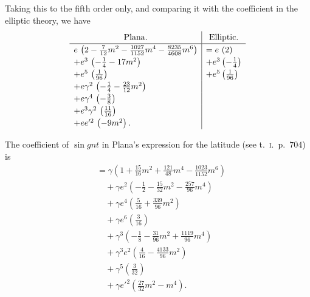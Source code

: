 \documentclass[11pt]{article}
\begin{document}
\medskip

Taking this to the fifth order only, and comparing it with the
coefficient in the elliptic theory, we have
\[
\renewcommand{\arraystretch}{1.2}
\begin{array}{l|l}
\multicolumn{1}{c|}{\text{Plana.}} & \multicolumn{1}{c}{\text{Elliptic.}} \\
\hline
e\,\left(2 - \tfrac{7}{12}m^{2} - \tfrac{1027}{1152}m^{4} - \tfrac{8235}{4608}m^{6}\right)
   & = e\,\left(2\right) \\
+ e^{3}\,\left(-\tfrac{1}{4} - 17m^{2}\right) & + e^{3}\left(-\tfrac{1}{4}\right) \\
+ e^{5}\,\left(\tfrac{1}{96}\right) & + e^{5}\left(\tfrac{1}{96}\right) \\
+ e\gamma^{2}\,\left(-\tfrac{1}{4} - \tfrac{23}{12}m^{2}\right) \\
+ e\gamma^{4}\,\left(-\tfrac{3}{8}\right) \\
+ e^{3}\gamma^{2}\,\left(\tfrac{11}{16}\right) \\
+ ee'^{2}\,\left(-9m^{2}\right).
\end{array}
\]

The coefficient of $\sin gnt$ in Plana's expression for the latitude
(see t.\ \textsc{i}.\ p.\ $704$) is
\begin{align*}
&\!= \gamma\!\left(1 + \tfrac{15}{16}m^{2} + \tfrac{121}{48}m^{4} - \tfrac{1023}{1152}m^{6}\right) \\
&\quad + \gamma e^{2}\!\left(-\tfrac{1}{2} - \tfrac{15}{32}m^{2} - \tfrac{257}{96}m^{4}\right) \\
&\quad + \gamma e^{4}\!\left(\tfrac{5}{16} + \tfrac{339}{96}m^{2}\right) \\
&\quad + \gamma e^{6}\!\left(\tfrac{3}{16}\right) \\
&\quad + \gamma^{3}\!\left(-\tfrac{1}{8} - \tfrac{31}{96}m^{2} + \tfrac{1119}{96}m^{4}\right) \\
&\quad + \gamma^{3}e^{2}\!\left(\tfrac{4}{16} - \tfrac{4133}{96}m^{2}\right) \\
&\quad + \gamma^{5}\!\left(\tfrac{3}{32}\right) \\
&\quad + \gamma e'^{2}\!\left(\tfrac{27}{32}m^{2} - m^{4}\right).
\end{align*}
\end{document}
